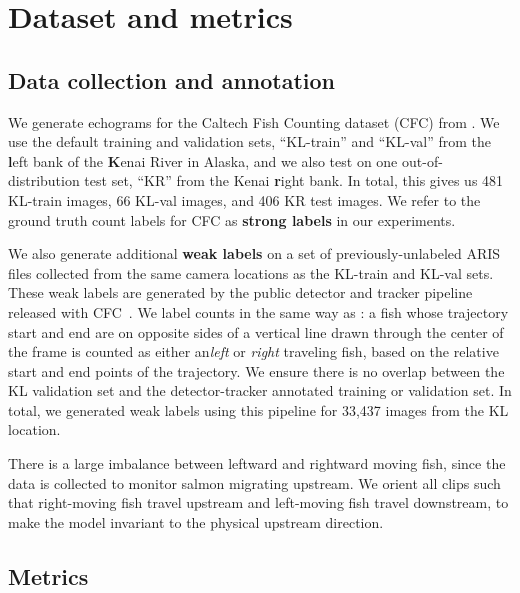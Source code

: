 \section{Dataset and metrics}

\subsection{Data collection and annotation}
\label{sec:data}

We generate echograms for the Caltech Fish Counting dataset (CFC) from \cite{kay2022caltechfishcountingdataset}. We use the default training and validation sets, ``KL-train'' and ``KL-val'' from the \textbf{l}eft bank of the \textbf{K}enai River in Alaska, and we also test on one out-of-distribution test set, ``KR'' from the Kenai \textbf{r}ight bank. %
In total, this gives us 481 KL-train images, 66 KL-val images, and 406 KR test images. We refer to the ground truth count labels for CFC as \textbf{strong labels} in our experiments.

We also generate additional \textbf{weak labels} on a set of previously-unlabeled ARIS files collected from the same camera locations as the KL-train and KL-val sets. These weak labels are generated by the public detector and tracker pipeline released with CFC~\cite{kay2022caltechfishcountingdataset}. We label counts in the same way as \cite{kay2022caltechfishcountingdataset}: a fish whose trajectory start and end are on opposite sides of a vertical line drawn through the center of the frame is counted as either an\textit{left} or \textit{right} traveling fish, based on the relative start and end points of the trajectory. We ensure there is no overlap between the KL validation set and the detector-tracker annotated training or validation set.
In total, we generated weak labels using this pipeline for 33,437 images from the KL location.

There is a large imbalance between leftward and rightward moving fish, since the data is collected to monitor salmon migrating upstream. We orient all clips such that right-moving fish travel upstream and left-moving fish travel downstream, to make the model invariant to the physical upstream direction.

\subsection{Metrics}


